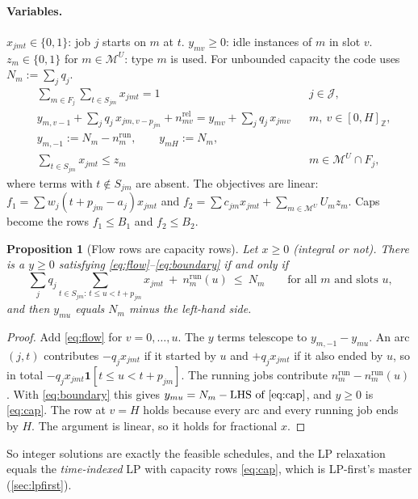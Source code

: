 \documentclass[11pt,a4paper]{article}
\newtheorem{proposition}[theorem]{Proposition}
\theoremstyle{definition}
\theoremstyle{remark}
\newcommand{\J}{\mathcal{J}}
\newcommand{\M}{\mathcal{M}}
\newcommand{\MU}{\M^{U}}
\newcommand{\Z}{\mathbb{Z}}
\newcommand{\ind}[1]{\mathbf{1}[#1]}
\newcommand{\nrun}{n^{\mathrm{run}}}
\newcommand{\nrel}{n^{\mathrm{rel}}}
\begin{document}
\paragraph{Variables.} $x_{jmt}\in\{0,1\}$: job $j$ starts on $m$ at $t$.
$y_{mv}\ge0$: idle instances of $m$ in slot $v$. $z_m\in\{0,1\}$ for $m\in\MU$:
type $m$ is used. For unbounded capacity the code uses $N_m:=\sum_jq_j$.
\begin{align}
&\textstyle\sum_{m\in F_j}\sum_{t\in S_{jm}}x_{jmt}=1 && j\in\J, \label{eq:assign}\\
&\textstyle y_{m,v-1}+\sum_{j}q_j\,x_{jm,v-p_{jm}}+\nrel_{mv}
 =y_{mv}+\sum_{j}q_j\,x_{jmv} && m,\ v\in[0,H]_\Z, \label{eq:flow}\\
&y_{m,-1}:=N_m-\nrun_m,\qquad y_{mH}:=N_m, \label{eq:boundary}\\
&\textstyle\sum_{t\in S_{jm}}x_{jmt}\le z_m && m\in\MU\cap F_j, \label{eq:fixed}
\end{align}
where terms with $t\notin S_{jm}$ are absent. The objectives are linear:
$f_1=\sum w_j(t+p_{jm}-a_j)x_{jmt}$ and
$f_2=\sum c_{jm}x_{jmt}+\sum_{m\in\MU}U_mz_m$. Caps become the rows
$f_1\le B_1$ and $f_2\le B_2$.

\begin{proposition}[Flow rows are capacity rows]\label{prop:capacity}
Let $x\ge0$ (integral or not). There is a $y\ge0$ satisfying
\eqref{eq:flow}--\eqref{eq:boundary} if and only if
\begin{equation}\label{eq:cap}
\sum_{j}q_j\!\!\sum_{t\in S_{jm}:\,t\le u<t+p_{jm}}\!\!x_{jmt}\ +\ \nrun_m(u)\ \le\ N_m
\qquad\text{for all $m$ and slots $u$,}
\end{equation}
and then $y_{mu}$ equals $N_m$ minus the left-hand side.
\end{proposition}

\begin{proof}
Add \eqref{eq:flow} for $v=0,\dots,u$. The $y$ terms telescope to
$y_{m,-1}-y_{mu}$. An arc $(j,t)$ contributes $-q_jx_{jmt}$ if it started by
$u$ and $+q_jx_{jmt}$ if it also ended by $u$, so in total
$-q_jx_{jmt}\ind{t\le u<t+p_{jm}}$. The running jobs contribute
$\nrun_m-\nrun_m(u)$. With \eqref{eq:boundary} this gives $y_{mu}=N_m-\text{LHS of \eqref{eq:cap}}$,
and $y\ge0$ is \eqref{eq:cap}. The row at $v=H$ holds because every arc and every
running job ends by $H$. The argument is linear, so it holds for fractional $x$.
\end{proof}

So integer solutions are exactly the feasible schedules, and the LP relaxation
equals the \emph{time-indexed} LP with capacity rows \eqref{eq:cap}, which is
LP-first's master (\cref{sec:lpfirst}).
\end{document}
